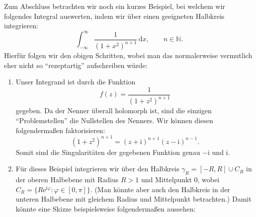 \documentclass{article}
\theoremstyle{plain}
\theoremstyle{definition}
\begin{document}
Zum Abschluss betrachten wir noch ein kurzes Beispiel, bei welchem wir folgendes Integral auswerten, indem wir über einen geeigneten Halbkreis integrieren:
\[
	\int_{-\infty}^{\infty} \frac{1}{(1 + x^2)^{n + 1}} \,\mathrm{d}x, \qquad n \in \mathbb{N}.
\]
Hierfür folgen wir den obigen Schritten, wobei man das normalerweise vermutlich eher nicht so \enquote{rezeptartig} aufschreiben würde:
\begin{enumerate}
	\item Unser Integrand ist durch die Funktion
	      \[
		      f(z) = \frac{1}{(1 + z^2)^{n + 1}}
	      \]
	      gegeben.
	      Da der Nenner überall holomorph ist, sind die einzigen \enquote{Problemstellen} die Nullstellen des Nenners.
	      Wir können diesen folgendermaßen faktorisieren:
	      \[
		      (1 + z^2)^{n + 1} = (z + \mathrm{i})^{n + 1} (z - \mathrm{i})^{n - 1}.
	      \]
	      Somit sind die Singularitäten der gegebenen Funktion genau $-\mathrm{i}$ und $\mathrm{i}$.
	\item Für dieses Beispiel integrieren wir über den Halbkreis $\gamma_{R} = [-R, R] \cup C_R$ in der oberen Halbebene mit Radius $R > 1$ und Mittelpunkt $0$, wobei $C_R = \{R \mathrm{e}^{\mathrm{i} \varphi} : \varphi \in [0, \pi]\}$.
	      (Man könnte aber auch den Halbkreis in der unteren Halbebene mit gleichem Radius und Mittelpunkt betrachten.)
	      Damit könnte eine Skizze beispielsweise folgendermaßen aussehen:
	      \begin{center}

\end{center}
\end{enumerate}
\end{document}
